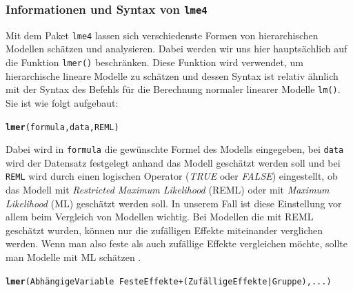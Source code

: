 \documentclass[12pt]{article}\usepackage[]{graphicx}\usepackage[]{color}
\makeatletter
\newcommand{\hlstd}[1]{\textcolor[rgb]{0.345,0.345,0.345}{#1}}%
\newcommand{\hlkwd}[1]{\textcolor[rgb]{0.737,0.353,0.396}{\textbf{#1}}}%
\newenvironment{kframe}{%
 \def\at@end@of@kframe{}%
 \ifinner\ifhmode%
  \def\at@end@of@kframe{\end{minipage}}%
  \begin{minipage}{\columnwidth}%
 \fi\fi%
 \def\FrameCommand##1{\hskip\@totalleftmargin \hskip-\fboxsep
 \colorbox{shadecolor}{##1}\hskip-\fboxsep
     \hskip-\linewidth \hskip-\@totalleftmargin \hskip\columnwidth}%
 \MakeFramed {\advance\hsize-\width
   \@totalleftmargin\z@ \linewidth\hsize
   \@setminipage}}%
 {\par\unskip\endMakeFramed%
 \at@end@of@kframe}
\newenvironment{knitrout}{}{} %
\makeatother
\begin{document}
\subsubsection{Informationen und Syntax von \texttt{lme4}}
Mit dem Paket \texttt{lme4} lassen sich verschiedenste Formen von hierarchischen Modellen schätzen und analysieren. Dabei werden wir uns hier hauptsächlich auf die Funktion \texttt{lmer()} beschränken. Diese Funktion wird verwendet, um hierarchische lineare Modelle zu schätzen und dessen Syntax ist relativ ähnlich mit der Syntax des Befehls für die Berechnung normaler linearer Modelle \texttt{lm()}. Sie ist wie folgt aufgebaut:

\begin{knitrout}
\color{fgcolor}\begin{kframe}
\begin{alltt}
\hlkwd{lmer}\hlstd{(formula, data, REML)}
\end{alltt}
\end{kframe}
\end{knitrout}

Dabei wird in \texttt{formula} die gewünschte Formel des Modells eingegeben, bei \texttt{data} wird der Datensatz festgelegt anhand das Modell geschätzt werden soll und bei \texttt{REML} wird durch einen logischen Operator (\textit{TRUE} oder \textit{FALSE}) eingestellt, ob das Modell mit \textit{Restricted Maximum Likelihood} (REML) oder mit \textit{Maximum Likelihood} (ML) geschätzt werden soll. In unserem Fall ist diese Einstellung vor allem beim Vergleich von Modellen wichtig. Bei Modellen die mit REML geschätzt wurden, können nur die zufälligen Effekte miteinander verglichen werden. Wenn man also feste als auch zufällige Effekte vergleichen möchte, sollte man Modelle mit ML schätzen \citep{PEUGH201085}. 

\begin{knitrout}
\color{fgcolor}\begin{kframe}
\begin{alltt}
\hlkwd{lmer}(Abhängige Variable ~ Feste Effekte + (Zufällige Effekte | Gruppe), ... )
\end{alltt}
\end{kframe}
\end{knitrout}
\end{document}
